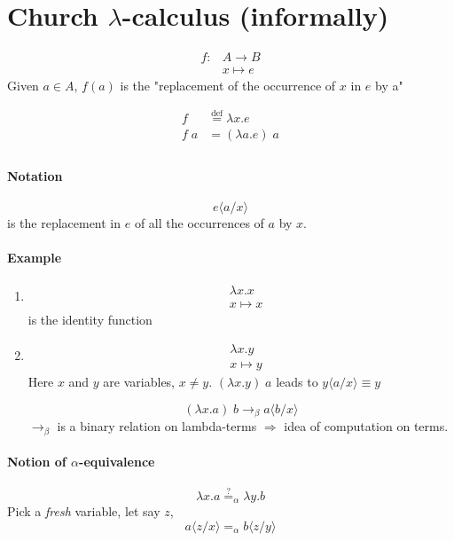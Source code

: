 \documentclass{article}
\newcommand\subst[2]{\langle #1\big/#2\rangle}
\begin{document}
\section{Church $\lambda$-calculus (informally)}
\begin{align*}
f: &A \to B\\
& x \mapsto e
\end{align*}
Given $a\in A$, $f(a)$ is the "replacement of the occurrence of $x$ in $e$ by a"

\begin{align*}
f & \overset{\text{def}}{=} \lambda x.e \tag{$\lambda$-abstraction}\\
f\;a & = (\lambda a.e) \;a \tag{Application}\\
\end{align*}

\paragraph{Notation}
\[e\subst{a}{x}\] is the replacement in $e$ of all the occurrences of $a$ by $x$.

\paragraph{Example}
\begin{enumerate}
\item \begin{align*}
&\lambda x. x\\
&x\mapsto x
\end{align*}
is the identity function
\item \begin{align*}
&\lambda x.y\\
&x\mapsto y
\end{align*}
Here $x$ and $y$ are variables, $x\neq y$. $(\lambda x.y)\; a$ leads to $y\subst{a}{x}\equiv y$

\[ (\lambda x.a) \; b \to_\beta a\subst{b}{x}\]
$\to_\beta$ is a binary relation on lambda-terms $\Rightarrow$ idea of computation on terms.

\end{enumerate}

\paragraph{Notion of $\alpha$-equivalence}
\[\lambda x.a \overset{?}{=}_\alpha \lambda y.b\]
Pick a \emph{fresh} variable, let say $z$,
\[a\subst{z}{x} =_\alpha b\subst{z}{y}\]
\end{document}
